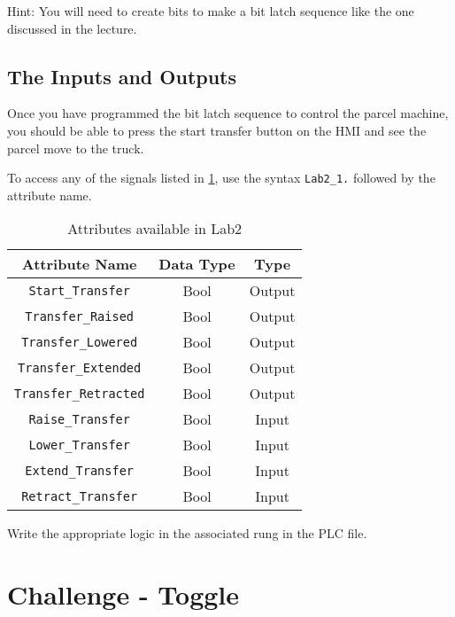 Hint: You will need to create bits to make a bit latch sequence like the one discussed in the lecture.


\subsection{The Inputs and Outputs}

Once you have programmed the bit latch sequence to control the parcel machine, you should be able to press the start transfer button on the HMI and see the parcel move to the truck.

To access any of the signals listed in \tableautorefname \ref{Table:Lab2_1Attributes}, use the syntax \verb|Lab2_1.| followed by the attribute name. 

\begin{table}[h]
\centering
\caption{Attributes available in Lab2}
\label{Table:Lab2_1Attributes}
\begin{tabular}{c c c}
\toprule
Attribute Name & Data Type & Type\\
\midrule
\verb|Start_Transfer| & Bool & Output \\
\verb|Transfer_Raised| & Bool & Output \\
\verb|Transfer_Lowered| & Bool & Output \\
\verb|Transfer_Extended| & Bool & Output \\
\verb|Transfer_Retracted| & Bool & Output \\
\midrule
\verb|Raise_Transfer| & Bool & Input\\
\verb|Lower_Transfer| & Bool & Input\\
\verb|Extend_Transfer| & Bool & Input\\
\verb|Retract_Transfer| & Bool & Input\\
\bottomrule
\end{tabular}
\end{table}

Write the appropriate logic in the associated rung in the PLC file.

\TASignatureSlot

\section{Challenge - Toggle}

